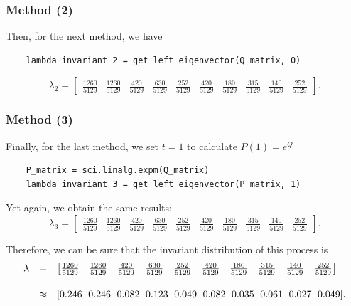 \subsubsection*{Method (2)}
Then, for the next method, we have
\begin{verbatim}
    lambda_invariant_2 = get_left_eigenvector(Q_matrix, 0)
\end{verbatim}
\[ \lambda_2 = \left[\begin{matrix}\frac{1260}{5129} & \frac{1260}{5129} & \frac{420}{5129} & \frac{630}{5129} & \frac{252}{5129} & \frac{420}{5129} & \frac{180}{5129} & \frac{315}{5129} & \frac{140}{5129} & \frac{252}{5129}\end{matrix}\right]. \]

\subsubsection*{Method (3)}
Finally, for the last method, we set $t = 1$ to calculate $P(1) = e^Q$
\begin{verbatim}
    P_matrix = sci.linalg.expm(Q_matrix)
    lambda_invariant_3 = get_left_eigenvector(P_matrix, 1)
\end{verbatim}
Yet again, we obtain the same results:
\[ \lambda_3 = \left[\begin{matrix}\frac{1260}{5129} & \frac{1260}{5129} & \frac{420}{5129} & \frac{630}{5129} & \frac{252}{5129} & \frac{420}{5129} & \frac{180}{5129} & \frac{315}{5129} & \frac{140}{5129} & \frac{252}{5129}\end{matrix}\right]. \]

Therefore, we can be sure that the invariant distribution of this process is 
\[\begin{array}{rcl}
    \lambda & = & \left[\begin{matrix}\frac{1260}{5129} & \frac{1260}{5129} & \frac{420}{5129} & \frac{630}{5129} & \frac{252}{5129} & \frac{420}{5129} & \frac{180}{5129} & \frac{315}{5129} & \frac{140}{5129} & \frac{252}{5129}\end{matrix}\right]\\[5mm]
    & \approx &  \mathtt{\text{[0.246\; 0.246\; 0.082\; 0.123\; 0.049\; 0.082\; 0.035\; 0.061\; 0.027\; 0.049]}}.
\end{array} \]

